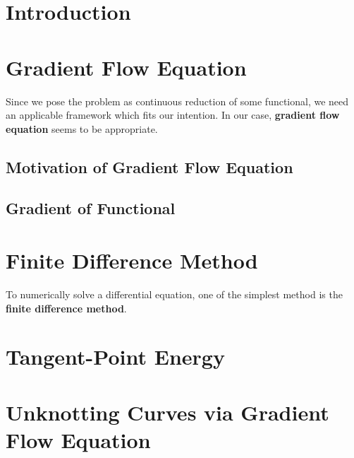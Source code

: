 \documentclass[a4paper, 12pt]{article}
\numberwithin{equation}{section}
\numberwithin{figure}{section}
\theoremstyle{definition}
\theoremstyle{plain}
\theoremstyle{plain}
\theoremstyle{plain}
\theoremstyle{remark}
\numberwithin{theorem}{section}
\theoremstyle{definition}
\begin{document}



\tableofcontents

\section{Introduction}


\section{Gradient Flow Equation}
Since we pose the problem as continuous reduction of some functional,
we need an applicable framework which fits our intention.
In our case, \textbf{gradient flow equation} seems to be appropriate.
\subsection{Motivation of Gradient Flow Equation}
\label{sct: Motivation of Gradient Flow Equation}

\subsection{Gradient of Functional}


\section{Finite Difference Method}
To numerically solve a differential equation,
one of the simplest method is the \textbf{finite difference method}.\cite{nspde}


\section{Tangent-Point Energy}


\section{Unknotting Curves via Gradient Flow Equation}

\end{document}
